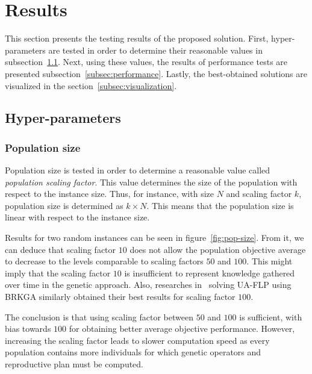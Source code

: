 \section{Results}\label{sec:results}

This section presents the testing results of the proposed solution.
First, hyper-parameters are tested in order to determine their reasonable values in subsection~\ref{subsec:hyper-parameters}.
Next, using these values, the results of performance tests are presented subsection~\ref{subsec:performance}.
Lastly, the best-obtained solutions are visualized in the section~\ref{subsec:visualization}.

\subsection{Hyper-parameters}\label{subsec:hyper-parameters}

\subsubsection*{Population size}

Population size is tested in order to determine a reasonable value called \textit{population scaling factor}.
This value determines the size of the population with respect to the instance size.
Thus, for instance, with size $N$ and scaling factor $k$, population size is determined as
$k \times N$.
This means that the population size is linear with respect to the instance size.

Results for two random instances can be seen in figure~\ref{fig:pop-size}.
From it, we can deduce that scaling factor $10$ does not allow
the population objective average to decrease to the levels comparable to scaling factors $50$ and $100$.
This might imply that the scaling factor $10$ is insufficient to represent knowledge gathered over time
in the genetic approach.
Also, researches in~\cite{goncalvesBiasedRandomkeyGenetic2015} solving UA-FLP using BRKGA
similarly obtained their best results for scaling factor $100$.

The conclusion is that using scaling factor between $50$ and $100$ is sufficient, with bias towards $100$
for obtaining better average objective performance.
However, increasing the scaling factor leads to slower computation speed as every population contains
more individuals for which genetic operators and reproductive plan must be computed.


